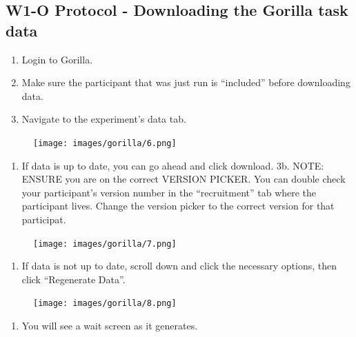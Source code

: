\documentclass[
]{book}
\providecommand{\tightlist}{%
  \setlength{\itemsep}{0pt}\setlength{\parskip}{0pt}}
\begin{document}
\hypertarget{w1-o-protocol---downloading-the-gorilla-task-data}{%
\subsection{W1-O Protocol - Downloading the Gorilla task data}\label{w1-o-protocol---downloading-the-gorilla-task-data}}

\begin{enumerate}
\def\labelenumi{\arabic{enumi}.}
\tightlist
\item
  Login to Gorilla.
\item
  Make sure the participant that was just run is ``included'' before downloading data.
\item
  Navigate to the experiment's data tab.
\end{enumerate}

\begin{figure}
\centering
\texttt{[image: images/gorilla/6.png]}
\caption{}
\end{figure}

\begin{enumerate}
\def\labelenumi{\arabic{enumi}.}
\setcounter{enumi}{2}
\tightlist
\item
  If data is up to date, you can go ahead and click download.
  3b. NOTE: ENSURE you are on the correct VERSION PICKER. You can double check your participant's version number in the ``recruitment'' tab where the participant lives. Change the version picker to the correct version for that participat.
\end{enumerate}

\begin{figure}
\centering
\texttt{[image: images/gorilla/7.png]}
\caption{}
\end{figure}

\begin{enumerate}
\def\labelenumi{\arabic{enumi}.}
\setcounter{enumi}{3}
\tightlist
\item
  If data is not up to date, scroll down and click the necessary options, then click ``Regenerate Data''.
\end{enumerate}

\begin{figure}
\centering
\texttt{[image: images/gorilla/8.png]}
\caption{}
\end{figure}

\begin{enumerate}
\def\labelenumi{\arabic{enumi}.}
\setcounter{enumi}{4}
\tightlist
\item
  You will see a wait screen as it generates.
\end{enumerate}
\end{document}
